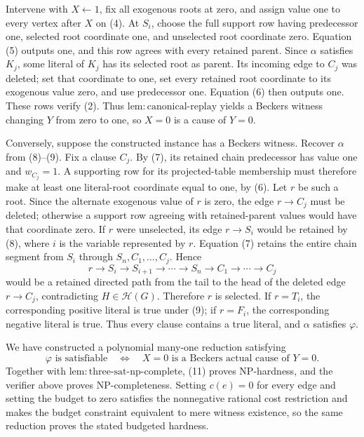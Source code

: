 Intervene with \(X\leftarrow1\), fix all exogenous roots at zero, and assign value one to every vertex after \(X\) on (4).  At \(S_i\), choose the full support row having predecessor one, selected root coordinate one, and unselected root coordinate zero.  Equation (5) outputs one, and this row agrees with every retained parent.  Since \(\alpha\) satisfies \(K_j\), some literal of \(K_j\) has its selected root as parent.  Its incoming edge to \(C_j\) was deleted; set that coordinate to one, set every retained root coordinate to its exogenous value zero, and use predecessor one.  Equation (6) then outputs one.  These rows verify (2).  Thus \(\mathrm{lem:canonical\mbox{-}replay}\) yields a Beckers witness changing \(Y\) from zero to one, so \(X=0\) is a cause of \(Y=0\).

Conversely, suppose the constructed instance has a Beckers witness.  Recover \(\alpha\) from (8)--(9).  Fix a clause \(C_j\).  By (7), its retained chain predecessor has value one and \(w_{C_j}=1\).  A supporting row for its projected-table membership must therefore make at least one literal-root coordinate equal to one, by (6).  Let \(r\) be such a root.  Since the alternate exogenous value of \(r\) is zero, the edge \(r\to C_j\) must be deleted; otherwise a support row agreeing with retained-parent values would have that coordinate zero.  If \(r\) were unselected, its edge \(r\to S_i\) would be retained by (8), where \(i\) is the variable represented by \(r\).  Equation (7) retains the entire chain segment from \(S_i\) through \(S_n,C_1,\ldots,C_j\).  Hence
\[
 r\to S_i\to S_{i+1}\to\cdots\to S_n\to C_1\to\cdots\to C_j                    \tag{10}
\]
would be a retained directed path from the tail to the head of the deleted edge \(r\to C_j\), contradicting \(H\in\mathcal H(G)\).  Therefore \(r\) is selected.  If \(r=T_i\), the corresponding positive literal is true under (9); if \(r=F_i\), the corresponding negative literal is true.  Thus every clause contains a true literal, and \(\alpha\) satisfies \(\varphi\).

We have constructed a polynomial many-one reduction satisfying
\[
 \varphi\text{ is satisfiable}
 \quad\Longleftrightarrow\quad
 X=0\text{ is a Beckers actual cause of }Y=0.                                      \tag{11}
\]
Together with \(\mathrm{lem:three\mbox{-}sat\mbox{-}np\mbox{-}complete}\), (11) proves \(\mathrm{NP}\)-hardness, and the verifier above proves \(\mathrm{NP}\)-completeness.  Setting \(c(e)=0\) for every edge and setting the budget to zero satisfies the nonnegative rational cost restriction and makes the budget constraint equivalent to mere witness existence, so the same reduction proves the stated budgeted hardness.

